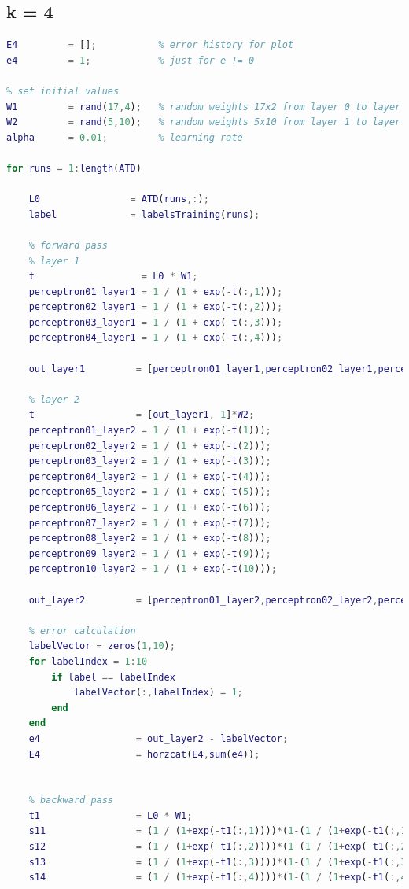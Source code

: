 \documentclass[12pt]{article}
\begin{document}
\subsection{k = 4}
\begin{lstlisting}[language=Matlab]
% k = 4, Training
E4         = [];           % error history for plot
e4         = 1;            % just for e != 0

% set initial values
W1         = rand(17,4);   % random weights 17x2 from layer 0 to layer 1
W2         = rand(5,10);   % random weights 5x10 from layer 1 to layer 2
alpha      = 0.01;         % learning rate

for runs = 1:length(ATD)
    
    L0                = ATD(runs,:);
    label             = labelsTraining(runs);
        
    % forward pass
    % layer 1
    t                   = L0 * W1;
    perceptron01_layer1 = 1 / (1 + exp(-t(:,1)));
    perceptron02_layer1 = 1 / (1 + exp(-t(:,2)));
    perceptron03_layer1 = 1 / (1 + exp(-t(:,3)));
    perceptron04_layer1 = 1 / (1 + exp(-t(:,4)));
    
    out_layer1         = [perceptron01_layer1,perceptron02_layer1,perceptron03_layer1,perceptron04_layer1];
    
    % layer 2
    t                  = [out_layer1, 1]*W2;
    perceptron01_layer2 = 1 / (1 + exp(-t(1)));
    perceptron02_layer2 = 1 / (1 + exp(-t(2)));
    perceptron03_layer2 = 1 / (1 + exp(-t(3)));
    perceptron04_layer2 = 1 / (1 + exp(-t(4)));
    perceptron05_layer2 = 1 / (1 + exp(-t(5)));
    perceptron06_layer2 = 1 / (1 + exp(-t(6)));
    perceptron07_layer2 = 1 / (1 + exp(-t(7)));
    perceptron08_layer2 = 1 / (1 + exp(-t(8)));
    perceptron09_layer2 = 1 / (1 + exp(-t(9)));
    perceptron10_layer2 = 1 / (1 + exp(-t(10)));
    
    out_layer2         = [perceptron01_layer2,perceptron02_layer2,perceptron03_layer2,perceptron04_layer2,perceptron05_layer2,perceptron06_layer2,perceptron07_layer2,perceptron08_layer2,perceptron09_layer2,perceptron10_layer2];
    
    % error calculation
    labelVector = zeros(1,10);
    for labelIndex = 1:10
        if label == labelIndex
            labelVector(:,labelIndex) = 1;
        end
    end
    e4                 = out_layer2 - labelVector;
    E4                 = horzcat(E4,sum(e4));
    
    
    % backward pass
    t1                 = L0 * W1;
    s11                = (1 / (1+exp(-t1(:,1))))*(1-(1 / (1+exp(-t1(:,1)))));
    s12                = (1 / (1+exp(-t1(:,2))))*(1-(1 / (1+exp(-t1(:,2)))));
    s13                = (1 / (1+exp(-t1(:,3))))*(1-(1 / (1+exp(-t1(:,3)))));
    s14                = (1 / (1+exp(-t1(:,4))))*(1-(1 / (1+exp(-t1(:,4)))));
       

\end{lstlisting}
\end{document}
